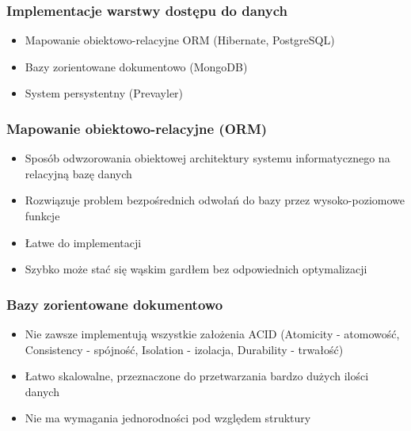 \documentclass{beamer}
\begin{document}
\begin{frame}
\frametitle{Implementacje warstwy dostępu do danych}
\begin{itemize}
\item Mapowanie obiektowo-relacyjne ORM (Hibernate, PostgreSQL)
\item Bazy zorientowane dokumentowo (MongoDB)
\item System persystentny (Prevayler)
\end{itemize}
\end{frame}

\begin{frame}
\frametitle{Mapowanie obiektowo-relacyjne (ORM)}
\begin{itemize}
\item Sposób odwzorowania obiektowej architektury systemu informatycznego na relacyjną bazę danych
\item Rozwiązuje problem bezpośrednich odwołań do bazy przez wysoko-poziomowe funkcje
\item Łatwe do implementacji
\item Szybko może stać się wąskim gardłem bez odpowiednich optymalizacji
\end{itemize}
\end{frame}

\begin{frame}
\frametitle{Bazy zorientowane dokumentowo}
\begin{itemize}
\item Nie zawsze implementują wszystkie założenia ACID (Atomicity - atomowość, Consistency - spójność, Isolation - izolacja, Durability - trwałość)
\item Łatwo skalowalne, przeznaczone do przetwarzania bardzo dużych ilości danych
\item Nie ma wymagania jednorodności pod względem struktury
\end{itemize}
\end{frame}
\end{document}
